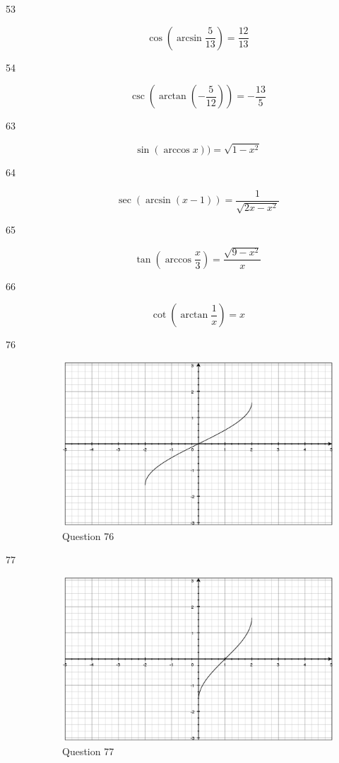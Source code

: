 \documentclass[fleqn,addpoints]{exam}
\begin{document}
\begin{description}
\item[53] 
\[
   \cos \left (\arcsin \frac{5}{13} \right) = \frac{12}{13}
\]

\item[54] 
\[
   \csc \left( \arctan \left( - \frac{5}{12} \right) \right) = - \frac{13}{5}
\]

\item[63] 
\[
   \sin(\arccos x)) = \sqrt{1 - x^2}
\]

\item[64] 
\[
   \sec(\arcsin(x-1)) = \frac{1}{\sqrt{2x - x^2}}
\]

\item[65] 
\[
   \tan\left( \arccos \frac{x}{3} \right) = \frac{\sqrt{9-x^2}}{x}
\]

\item[66] 
\[
   \cot \left( \arctan \frac{1}{x} \right) = x
\]

\item[76] 
\begin{figure}[H]
  \centering
  \includegraphics[scale=.3]{question_76.eps}
  \caption*{Question 76}
\end{figure}


\item[77] 
\begin{figure}[H]
  \centering
  \includegraphics[scale=.3]{question_77.eps}
  \caption*{Question 77}
\end{figure}


\end{description}
\end{document}
